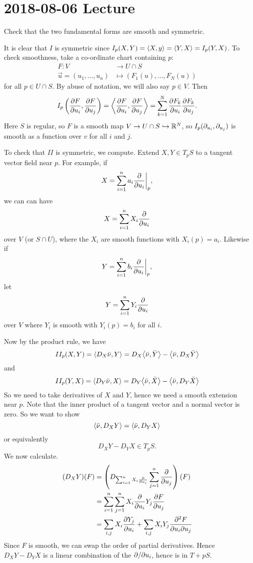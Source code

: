 \section{2018-08-06 Lecture}

Check that the two fundamental forms are smooth and symmetric.

It is clear that $I$ is symmetric since $I_p(X,Y) = {\left\langle X,y \right\rangle} = {\left\langle Y,X \right\rangle} = I_p(Y,X)$.
To check smoothness, take a co-ordinate chart containing $p$:
\begin{align*}
  F: V &\to U \cap S \\
\vec u = (u_1,\ldots,u_n) &\mapsto \left( F_1(u),\ldots,F_N(u) \right)
\end{align*}
for all $p \in U \cap S$.
By abuse of notation, we will also say $p \in V$.
Then
\[ I_p \left( \frac{\partial F}{\partial u_i}, \frac{\partial F}{\partial u_j} \right) = {\left\langle  \frac{\partial F}{\partial u_i}, \frac{\partial F}{\partial u_j}  \right\rangle} = \sum_{k=1}^N \frac{\partial F_k}{\partial u_i} \frac{\partial F_k}{\partial u_j}. \]
Here $S$ is regular, so $F$  is a smooth map $V \to U \cap S \hookrightarrow \mathbb{R}^N$, so $I_p(\partial_{u_i},\partial_{u_j})$ is smooth as a function over $v$ for all $i$ and $j$.

To check that $II$ is symmetric, we compute.
Extend $X, Y \in T_pS$ to a tangent vector field near $p$.
For example, if
\[ X = \sum_{i=1}^n a_i \frac{\partial}{\partial u_i} \bigg\vert_p, \]
we can can have
\[ X = \sum_{i=1}^n X_i \frac{\partial}{\partial u_i} \]
over $V$ (or $S \cap U$), where the $X_i$ are smooth functions with $X_i(p) = a_i$.
Likewise if
\[ Y = \sum_{i=1}^n b_i \frac{\partial}{\partial u_i} \bigg\vert_p, \]
let
\[ Y = \sum_{i=1}^n Y_i \frac{\partial}{\partial u_i} \]
over $V$ where $Y_i$ is smooth with $Y_i(p)=b_i$ for all $i$.

Now by the product rule, we have
\[ II_p(X,Y) = {\left\langle D_X \bar\nu, Y \right\rangle} = D_X {\left\langle \bar\nu, \bar Y \right\rangle} - {\left\langle \bar\nu, D_X\bar Y \right\rangle} \]
and
\[ II_p(Y,X) = {\left\langle D_Y \bar\nu, X \right\rangle} = D_Y {\left\langle \bar\nu, \bar X \right\rangle} - {\left\langle \bar\nu, D_Y\bar X \right\rangle} \]
So we need to take derivatives of $X$ and $Y$, hence we need a smooth extension near $p$.
Note that the inner product of a tangent vector and a normal vector is zero.
So we want to show
\[ {\left\langle \bar\nu, D_X Y \right\rangle} = {\left\langle \bar\nu, D_Y X \right\rangle} \]
or equivalently 
\[ D_XY - D_YX \in T_pS. \]
We now calculate.
\begin{align*}
  (D_XY)(F) &= \left( D_{ \sum_{i=1}^n X_i \frac{\partial}{\partial u_i} } \sum_{j=1}^n \frac{\partial}{\partial u_j} \right)(F) \\
  &= \sum_{i=1}^n \sum_{j=1}^n X_i \frac{\partial}{\partial u_i} Y_j \frac{\partial F}{\partial u_j} \\
  &= \sum_{i,j} X_i \frac{\partial Y_j}{\partial u_i} + \sum_{i,j} X_i Y_j \frac{\partial^2 F}{\partial u_i \partial u_j}
\end{align*}
Since $F$ is smooth, we can swap the order of partial derivatives.
Hence $D_XY-D_YX$ is a linear combination of the $\partial/\partial u_i$, hence is in $T+pS$.

